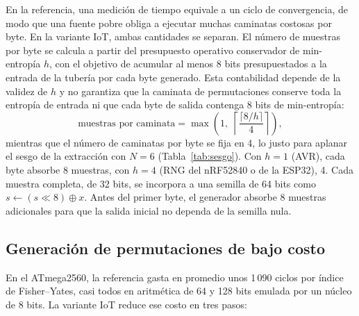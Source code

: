 En la referencia, una medición de tiempo equivale a un ciclo de convergencia, de modo que una fuente pobre obliga a ejecutar muchas caminatas costosas por byte. En la variante IoT, ambas cantidades se separan. El número de muestras por byte se calcula a partir del presupuesto operativo conservador de min-entropía $h$, con el objetivo de acumular al menos 8 bits presupuestados a la entrada de la tubería por cada byte generado. Esta contabilidad depende de la validez de $h$ y no garantiza que la caminata de permutaciones conserve toda la entropía de entrada ni que cada byte de salida contenga 8 bits de min-entropía:
\begin{equation}
    \text{muestras por caminata} = \max\!\left(1,\; \left\lceil \frac{\lceil 8 / h \rceil}{4} \right\rceil \right),
\end{equation}
mientras que el número de caminatas por byte se fija en 4, lo justo para aplanar el sesgo de la extracción con $N = 6$ (Tabla~\ref{tab:sesgo}). Con $h = 1$ (AVR), cada byte absorbe 8 muestras, con $h = 4$ (RNG del nRF52840 o de la ESP32), 4. Cada muestra completa, de 32 bits, se incorpora a una semilla de 64 bits como $s \leftarrow (s \ll 8) \oplus x$. Antes del primer byte, el generador absorbe 8 muestras adicionales para que la salida inicial no dependa de la semilla nula.

\subsection{Generación de permutaciones de bajo costo}

En el ATmega2560, la referencia gasta en promedio unos 1\,090 ciclos por índice de Fisher--Yates, casi todos en aritmética de 64 y 128 bits emulada por un núcleo de 8 bits. La variante IoT reduce ese costo en tres pasos:

